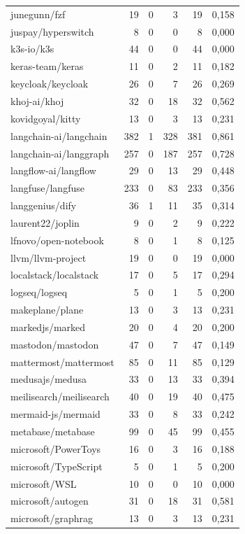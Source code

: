 \begin{tabular}{lrrrrr}
junegunn/fzf & 19 & 0 & 3 & 19 & 0,158 \\
juspay/hyperswitch & 8 & 0 & 0 & 8 & 0,000 \\
k3s-io/k3s & 44 & 0 & 0 & 44 & 0,000 \\
keras-team/keras & 11 & 0 & 2 & 11 & 0,182 \\
keycloak/keycloak & 26 & 0 & 7 & 26 & 0,269 \\
khoj-ai/khoj & 32 & 0 & 18 & 32 & 0,562 \\
kovidgoyal/kitty & 13 & 0 & 3 & 13 & 0,231 \\
langchain-ai/langchain & 382 & 1 & 328 & 381 & 0,861 \\
langchain-ai/langgraph & 257 & 0 & 187 & 257 & 0,728 \\
langflow-ai/langflow & 29 & 0 & 13 & 29 & 0,448 \\
langfuse/langfuse & 233 & 0 & 83 & 233 & 0,356 \\
langgenius/dify & 36 & 1 & 11 & 35 & 0,314 \\
laurent22/joplin & 9 & 0 & 2 & 9 & 0,222 \\
lfnovo/open-notebook & 8 & 0 & 1 & 8 & 0,125 \\
llvm/llvm-project & 19 & 0 & 0 & 19 & 0,000 \\
localstack/localstack & 17 & 0 & 5 & 17 & 0,294 \\
logseq/logseq & 5 & 0 & 1 & 5 & 0,200 \\
makeplane/plane & 13 & 0 & 3 & 13 & 0,231 \\
markedjs/marked & 20 & 0 & 4 & 20 & 0,200 \\
mastodon/mastodon & 47 & 0 & 7 & 47 & 0,149 \\
mattermost/mattermost & 85 & 0 & 11 & 85 & 0,129 \\
medusajs/medusa & 33 & 0 & 13 & 33 & 0,394 \\
meilisearch/meilisearch & 40 & 0 & 19 & 40 & 0,475 \\
mermaid-js/mermaid & 33 & 0 & 8 & 33 & 0,242 \\
metabase/metabase & 99 & 0 & 45 & 99 & 0,455 \\
microsoft/PowerToys & 16 & 0 & 3 & 16 & 0,188 \\
microsoft/TypeScript & 5 & 0 & 1 & 5 & 0,200 \\
microsoft/WSL & 10 & 0 & 0 & 10 & 0,000 \\
microsoft/autogen & 31 & 0 & 18 & 31 & 0,581 \\
microsoft/graphrag & 13 & 0 & 3 & 13 & 0,231 \\

\end{tabular}
